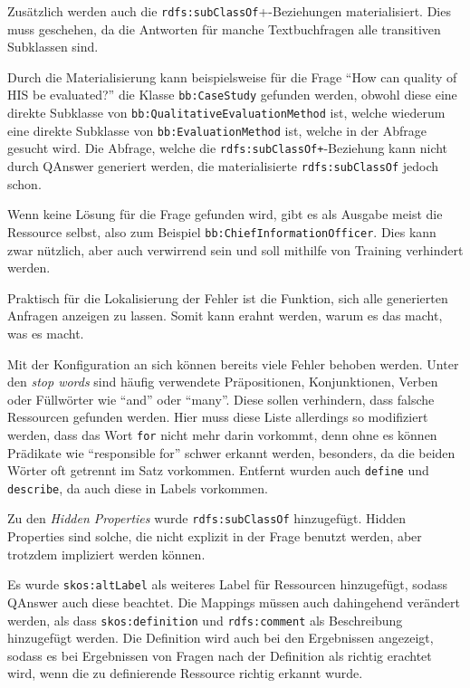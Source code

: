 \documentclass[utf8,biblatex]{lni}
\begin{document}
Zusätzlich werden auch die \texttt{rdfs:subClassOf}+-Beziehungen materialisiert.
Dies muss geschehen, da die Antworten für manche Textbuchfragen alle transitiven Subklassen sind.

Durch die Materialisierung kann beispielsweise für die Frage \enquote{How can quality of HIS be evaluated?}
die Klasse \texttt{bb:CaseStudy} gefunden werden, obwohl diese eine direkte Subklasse von \texttt{bb:QualitativeEvaluationMethod} ist,
welche wiederum eine direkte Subklasse von \texttt{bb:EvaluationMethod} ist, welche in der Abfrage gesucht wird.
Die Abfrage, welche die \texttt{rdfs:subClassOf+}-Beziehung kann nicht durch QAnswer generiert werden, die materialisierte \texttt{rdfs:subClassOf} jedoch schon.

Wenn keine Lösung für die Frage gefunden wird, gibt es als Ausgabe meist die Ressource selbst, also zum Beispiel \texttt{bb:ChiefInformationOfficer}.
Dies kann zwar nützlich, aber auch verwirrend sein und soll mithilfe von Training verhindert werden.

Praktisch für die Lokalisierung der Fehler ist die Funktion, sich alle generierten Anfragen anzeigen zu lassen.
Somit kann erahnt werden, warum es das macht, was es macht.

Mit der Konfiguration an sich können bereits viele Fehler behoben werden.
Unter den \emph{stop words} sind häufig verwendete Präpositionen, Konjunktionen, Verben oder Füllwörter wie \enquote{and} oder \enquote{many}.
Diese sollen verhindern, dass falsche Ressourcen gefunden werden.
Hier muss diese Liste allerdings so modifiziert werden, dass das Wort \texttt{for} nicht mehr darin vorkommt, denn ohne es können Prädikate wie \enquote{responsible for} schwer erkannt werden,
besonders, da die beiden Wörter oft getrennt im Satz vorkommen.
Entfernt wurden auch \texttt{define} und \texttt{describe}, da auch diese in Labels vorkommen.

Zu den \emph{Hidden Properties} wurde \texttt{rdfs:subClassOf} hinzugefügt.
Hidden Properties sind solche, die nicht explizit in der Frage benutzt werden, aber trotzdem impliziert werden können.

Es wurde \texttt{skos:altLabel} als weiteres Label für Ressourcen hinzugefügt, sodass QAnswer auch diese beachtet.
Die Mappings müssen auch dahingehend verändert werden, als dass \texttt{skos:definition}
und \texttt{rdfs:comment} als Beschreibung hinzugefügt werden.
Die Definition wird auch bei den Ergebnissen angezeigt, sodass es bei Ergebnissen von Fragen nach der Definition als richtig erachtet wird, wenn die zu definierende Ressource richtig erkannt wurde.
\end{document}
